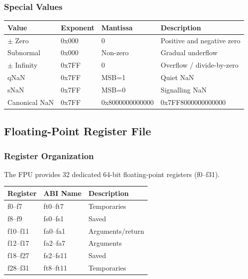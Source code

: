 \subsubsection{Special Values}

\begin{table}[H]
\centering
\begin{tabular}{|l|l|l|l|}
\hline
\textbf{Value} & \textbf{Exponent} & \textbf{Mantissa} & \textbf{Description} \\ \hline
$\pm$ Zero & 0x000 & 0 & Positive and negative zero \\ \hline
Subnormal & 0x000 & Non-zero & Gradual underflow \\ \hline
$\pm$ Infinity & 0x7FF & 0 & Overflow / divide-by-zero \\ \hline
qNaN & 0x7FF & MSB=1 & Quiet NaN \\ \hline
sNaN & 0x7FF & MSB=0 & Signalling NaN \\ \hline
Canonical NaN & 0x7FF & 0x8000000000000 & 0x7FF8000000000000 \\ \hline
\end{tabular}
\end{table}

\subsection{Floating-Point Register File}

\subsubsection{Register Organization}
The FPU provides 32 dedicated 64-bit floating-point registers (f0–f31).

\begin{table}[H]
\centering
\begin{tabular}{|l|l|l|}
\hline
\textbf{Register} & \textbf{ABI Name} & \textbf{Description} \\ \hline
f0–f7 & ft0–ft7 & Temporaries \\ \hline
f8–f9 & fs0–fs1 & Saved \\ \hline
f10–f11 & fa0–fa1 & Arguments/return \\ \hline
f12–f17 & fa2–fa7 & Arguments \\ \hline
f18–f27 & fs2–fs11 & Saved \\ \hline
f28–f31 & ft8–ft11 & Temporaries \\ \hline
\end{tabular}
\end{table}

